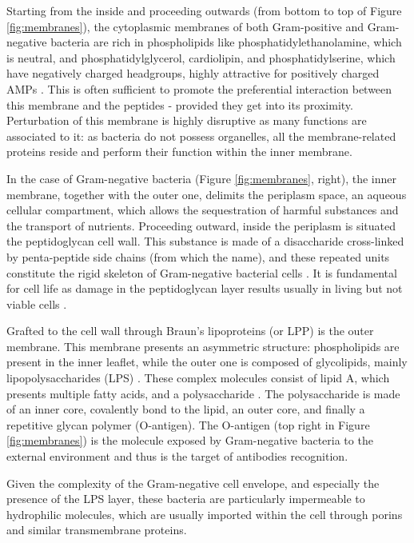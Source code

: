 Starting from the inside and proceeding outwards (from bottom to top of Figure \ref{fig:membranes}), the cytoplasmic membranes of both Gram-positive and Gram-negative bacteria are rich in phospholipids like phosphatidylethanolamine, which is neutral, and phosphatidylglycerol, cardiolipin, and phosphatidylserine, which have negatively charged headgroups, highly attractive for positively charged AMPs \citep{Silhavy2010,Lin2016}. This is often sufficient to promote the preferential interaction between this membrane and the peptides - provided they get into its proximity.
%
Perturbation of this membrane is highly disruptive as many functions are associated to it: as bacteria do not possess organelles, all the membrane-related proteins reside and perform their function within the inner membrane.

In the case of Gram-negative bacteria (Figure \ref{fig:membranes}, right), the inner membrane, together with the outer one, delimits the periplasm space, an aqueous cellular compartment, which allows the sequestration of harmful substances and the transport of nutrients.
%
Proceeding outward, inside the periplasm is situated the peptidoglycan cell wall. This substance is made of a disaccharide cross-linked by penta-peptide side chains (from which the name), and these repeated units constitute the rigid skeleton of Gram-negative bacterial cells \citep{Gan2008}. It is fundamental for cell life as damage in the peptidoglycan layer results usually in living but not viable cells \citep{Joseleau-Petit2007}.

Grafted to the cell wall through Braun’s lipoproteins (or LPP) \citep{Asmar2018} is the outer membrane. This membrane presents an asymmetric structure: phospholipids are present in the inner leaflet, while the outer one is composed of glycolipids, mainly lipopolysaccharides (LPS) \citep{Silhavy2010}. These complex molecules consist of lipid A, which presents multiple fatty acids, and a polysaccharide \citep{Raetz2002}. The polysaccharide is made of an inner core, covalently bond to the lipid, an outer core, and finally a repetitive glycan polymer (O-antigen). The O-antigen (top right in Figure \ref{fig:membranes}) is the molecule exposed by Gram-negative bacteria to the external environment and thus is the target of antibodies recognition.

Given the complexity of the Gram-negative cell envelope, and especially the presence of the LPS layer, these bacteria are particularly impermeable to hydrophilic molecules, which are usually imported within the cell through porins and similar transmembrane proteins.

